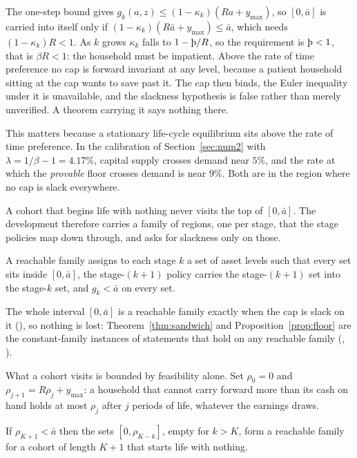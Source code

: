 The one-step bound gives $g_k(a,z)\le(1-\kappa_k)(Ra+y_{\max})$, so $[0,\bar a]$ is carried into
itself only if $(1-\kappa_k)(R\bar a+y_{\max})\le\bar a$, which needs $(1-\kappa_k)R<1$. As
$k$ grows $\kappa_k$ falls to $1-\text{\th}/R$, so the requirement is $\text{\th}<1$, that is
$\beta R<1$: the household must be impatient. Above the rate of time preference no cap is forward
invariant at any level, because a patient household sitting at the cap wants to save past it. The
cap then binds, the Euler inequality under it is unavailable, and the slackness hypothesis is
false rather than merely unverified. A theorem carrying it says nothing there.

This matters because a stationary life-cycle equilibrium sits above the rate of time preference.
In the calibration of Section~\ref{sec:num2} with $\lambda=1/\beta-1=4.17\%$, capital supply
crosses demand near $5\%$, and the rate at which the \emph{provable} floor crosses demand is
near $9\%$. Both are in the region where no cap is slack everywhere.

A cohort that begins life with nothing never visits the top of $[0,\bar a]$. The development
therefore carries a family of regions, one per stage, that the stage policies map down through,
and asks for slackness only on those.

\begin{definition}\label{def:regions}
A reachable family assigns to each stage $k$ a set of asset levels such that every set sits
inside $[0,\bar a]$, the stage-$(k+1)$ policy carries the stage-$(k+1)$ set into the stage-$k$
set, and $g_k<\bar a$ on every set.
\end{definition}

The whole interval $[0,\bar a]$ is a reachable family exactly when the cap is slack on it
(), so nothing is lost: Theorem~\ref{thm:sandwich} and
Proposition~\ref{prop:floor} are the constant-family instances of statements that hold on any
reachable family (, ).

What a cohort visits is bounded by feasibility alone. Set $\rho_0=0$ and
$\rho_{j+1}=R\rho_j+y_{\max}$: a household that cannot carry forward more than its cash on hand
holds at most $\rho_j$ after $j$ periods of life, whatever the earnings draws.

\begin{proposition}\label{prop:reach}
If $\rho_{K+1}<\bar a$ then the sets $[0,\rho_{K-k}]$, empty for $k>K$, form a reachable family
for a cohort of length $K+1$ that starts life with nothing.
\end{proposition}

